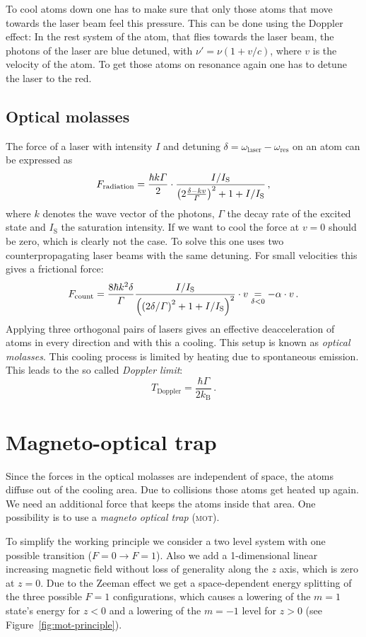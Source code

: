 \documentclass[11pt, english, fleqn, DIV=15, headinclude, BCOR=2cm]{scrreprt}
\newcommand\mot{\textsc{mot}}
\begin{document}
To cool atoms down one has to make sure that only those atoms that move
towards the laser beam feel this pressure. This can be done using the Doppler
effect: In the rest system of the atom, that flies towards the laser beam, the
photons of the laser are blue detuned, with $\nu'=\nu(1+v/c)$, where $v$ is
the velocity of the atom. To get those atoms on resonance again one has to
detune the laser to the red.

\subsection{Optical molasses}

The force of a laser with intensity $I$ and detuning $\delta =
\omega_\text{laser}-\omega_\text{res}$ on an atom can be expressed as
\[
    F_\text{radiation} = \frac{\hbar k\Gamma}2\cdot\frac{I/I_\text{S}}{\left( 2\frac{\delta -
    kv}\Gamma \right)^2 + 1 + I/I_\text{S}}\, ,
\]
where $k$ denotes the wave vector of the photons, $\Gamma$ the decay rate of
the excited state and $I_\text{S}$ the saturation intensity. If we want to cool
the force at $v=0$ should be zero, which is clearly not the case. To solve this
one uses two counterpropagating laser beams with the same detuning. For small
velocities this gives a frictional force:
\[
    F_\text{count} = \frac{8\hbar k^2\delta}{\Gamma}
    \frac{I/I_\text{S}}{\left( \left( 2\delta/\Gamma \right)^2 + 1 + I/I_\text{S} \right)^2}
    \cdot v \underset{\delta<0}{=} -\alpha\cdot v \, .
\]
Applying three orthogonal pairs of lasers gives an effective deacceleration of
atoms in every direction and with this a cooling. This setup is known as
\emph{optical molasses}. This cooling process is limited by heating due to
spontaneous emission. This leads to the so called \emph{Doppler limit}:
\[
    T_\text{Doppler} = \frac{\hbar \Gamma}{2k_\text{B}} \, .
\]

\section{Magneto-optical trap}

Since the forces in the optical molasses are independent of space, the atoms
 diffuse out of the cooling area. Due to collisions
those atoms get heated up again. We need an additional force that keeps the
atoms inside that area. One possibility is to use a \emph{magneto optical trap}
(\mot).

To simplify the working principle we consider a two level system with one
possible transition ($F=0 \to F=1$). Also we add a 1-dimensional linear
increasing magnetic field without loss of generality along the $z$ axis, which is zero at
$z=0$. Due to the Zeeman effect we get a space-dependent energy splitting of
the three possible $F=1$ configurations, which causes a lowering of the $m=1$
state's energy for $z<0$ and a lowering of the $m=-1$ level for $z>0$ (see
Figure~\ref{fig:mot-principle}).
\end{document}
